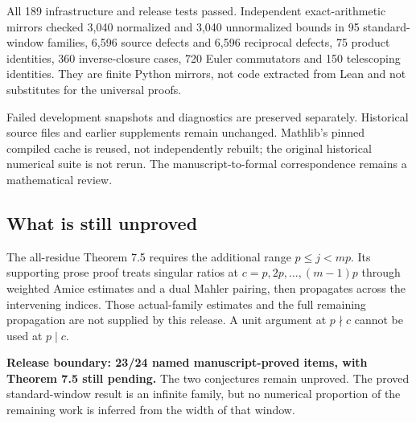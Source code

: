 \documentclass[11pt]{article}
\begin{document}
All 189 infrastructure and release tests passed. Independent exact-arithmetic mirrors checked 3,040 normalized and 3,040 unnormalized bounds in 95 standard-window families, 6,596 source defects and 6,596 reciprocal defects, 75 product identities, 360 inverse-closure cases, 720 Euler commutators and 150 telescoping identities. They are finite Python mirrors, not code extracted from Lean and not substitutes for the universal proofs.

Failed development snapshots and diagnostics are preserved separately. Historical source files and earlier supplements remain unchanged. Mathlib's pinned compiled cache is reused, not independently rebuilt; the original historical numerical suite is not rerun. The manuscript-to-formal correspondence remains a mathematical review.

\subsection*{What is still unproved}
The all-residue Theorem 7.5 requires the additional range $p\le j<mp$. Its supporting prose proof treats singular ratios at $c=p,2p,\ldots,(m-1)p$ through weighted Amice estimates and a dual Mahler pairing, then propagates across the intervening indices. Those actual-family estimates and the full remaining propagation are not supplied by this release. A unit argument at $p\nmid c$ cannot be used at $p\mid c$.

\textbf{Release boundary: 23/24 named manuscript-proved items, with Theorem 7.5 still pending.} The two conjectures remain unproved. The proved standard-window result is an infinite family, but no numerical proportion of the remaining work is inferred from the width of that window.
\end{document}
